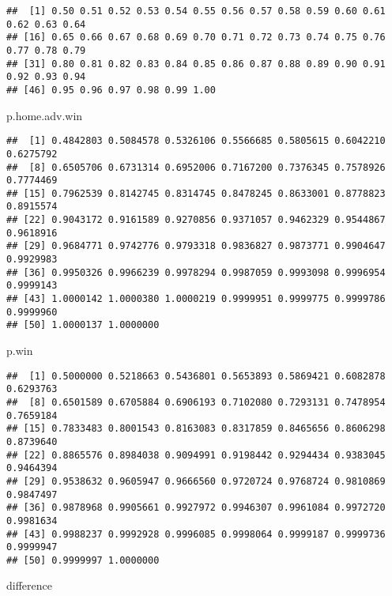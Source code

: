 \documentclass[
]{article}
\newenvironment{Shaded}{\begin{snugshade}}{\end{snugshade}}
\newcommand{\NormalTok}[1]{#1}
\begin{document}
\begin{verbatim}
##  [1] 0.50 0.51 0.52 0.53 0.54 0.55 0.56 0.57 0.58 0.59 0.60 0.61 0.62 0.63 0.64
## [16] 0.65 0.66 0.67 0.68 0.69 0.70 0.71 0.72 0.73 0.74 0.75 0.76 0.77 0.78 0.79
## [31] 0.80 0.81 0.82 0.83 0.84 0.85 0.86 0.87 0.88 0.89 0.90 0.91 0.92 0.93 0.94
## [46] 0.95 0.96 0.97 0.98 0.99 1.00
\end{verbatim}

\begin{Shaded}
\begin{Highlighting}[]
\NormalTok{p.home.adv.win}
\end{Highlighting}
\end{Shaded}

\begin{verbatim}
##  [1] 0.4842803 0.5084578 0.5326106 0.5566685 0.5805615 0.6042210 0.6275792
##  [8] 0.6505706 0.6731314 0.6952006 0.7167200 0.7376345 0.7578926 0.7774469
## [15] 0.7962539 0.8142745 0.8314745 0.8478245 0.8633001 0.8778823 0.8915574
## [22] 0.9043172 0.9161589 0.9270856 0.9371057 0.9462329 0.9544867 0.9618916
## [29] 0.9684771 0.9742776 0.9793318 0.9836827 0.9873771 0.9904647 0.9929983
## [36] 0.9950326 0.9966239 0.9978294 0.9987059 0.9993098 0.9996954 0.9999143
## [43] 1.0000142 1.0000380 1.0000219 0.9999951 0.9999775 0.9999786 0.9999960
## [50] 1.0000137 1.0000000
\end{verbatim}

\begin{Shaded}
\begin{Highlighting}[]
\NormalTok{p.win}
\end{Highlighting}
\end{Shaded}

\begin{verbatim}
##  [1] 0.5000000 0.5218663 0.5436801 0.5653893 0.5869421 0.6082878 0.6293763
##  [8] 0.6501589 0.6705884 0.6906193 0.7102080 0.7293131 0.7478954 0.7659184
## [15] 0.7833483 0.8001543 0.8163083 0.8317859 0.8465656 0.8606298 0.8739640
## [22] 0.8865576 0.8984038 0.9094991 0.9198442 0.9294434 0.9383045 0.9464394
## [29] 0.9538632 0.9605947 0.9666560 0.9720724 0.9768724 0.9810869 0.9847497
## [36] 0.9878968 0.9905661 0.9927972 0.9946307 0.9961084 0.9972720 0.9981634
## [43] 0.9988237 0.9992928 0.9996085 0.9998064 0.9999187 0.9999736 0.9999947
## [50] 0.9999997 1.0000000
\end{verbatim}

\begin{Shaded}
\begin{Highlighting}[]
\NormalTok{difference}
\end{Highlighting}
\end{Shaded}
\end{document}
